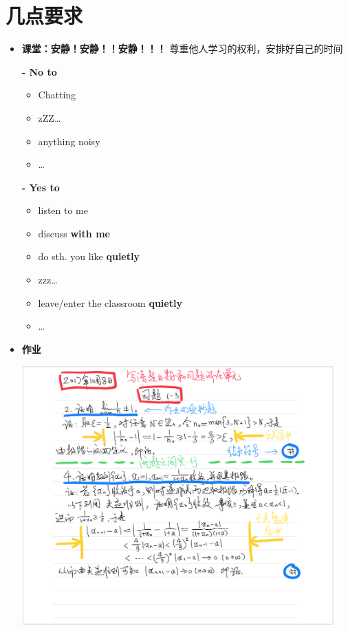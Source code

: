 \section{几点要求}
\begin{itemize}
	\item {\bf 课堂：安静！安静！！安静！！！}
	尊重他人学习的权利，安排好自己的时间
	
	{\bf - No to}
	  \begin{itemize}
	    \item Chatting
	    \item zZZ\ldots
	    \item anything noisy
	    \item \ldots
	  \end{itemize}
	{\bf - Yes to}
  \begin{itemize}
    \item listen to me
    \item discuss {\bf with me}
    \item do sth. you like {\bf quietly}
    \item zzz\ldots
    \item leave/enter the classroom {\bf quietly}
    \item \ldots
  \end{itemize}
  \item {\bf 作业}
  \begin{center}
  	\includegraphics[width=0.95\textwidth]{./images/00/hw-sample.jpg}
  	

\end{center}
\end{itemize}
